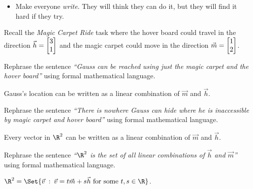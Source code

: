 \documentclass{problemset}
\newcommand{\bookonlynewpage}{\begin{bookonly}\newpage\end{bookonly}}
\begin{document}
	\bookonlynewpage
	\question
	\begin{annotation}
		\begin{goals}
		\end{goals}

		\begin{notes}
			\begin{itemize}
				\item Make everyone \emph{write}. They will think
					they can do it, but they will find it hard if
					they try.
			\end{itemize}
		\end{notes}
	\end{annotation}
	Recall the \emph{Magic Carpet Ride} task where the hover board could
	travel in the direction $\vec h=\mat{3\\1}$ and the magic carpet could
	move in the direction $\vec m=\mat{1\\2}$.
	\begin{parts}
		\item Rephrase the sentence \emph{``Gauss can be reached using just the
			magic carpet and the hover board''} using formal mathematical
			language.
			\begin{solution}
				Gauss's location can be written as a linear combination of
				$\vec m$ and $\vec h$.
			\end{solution}
		\item Rephrase the sentence \emph{``There is nowhere Gauss can hide
			where he is inaccessible by magic carpet and hover board''} using
			formal mathematical language.
			\begin{solution}
				Every vector in $\R^2$ can be written as a linear combination
				of $\vec m$ and	$\vec h$.
			\end{solution}
		\item Rephrase the sentence \emph{``$\R^2$ is the set of all linear
			combinations of $\vec h$ and $\vec m$''} using formal mathematical
			language.
			\begin{solution}
				$\R^2=\Set{\vec v\given \vec v=t\vec m+s\vec h\text{ for some }t,s\in \R}$.
			\end{solution}
	\end{parts}
\end{document}
